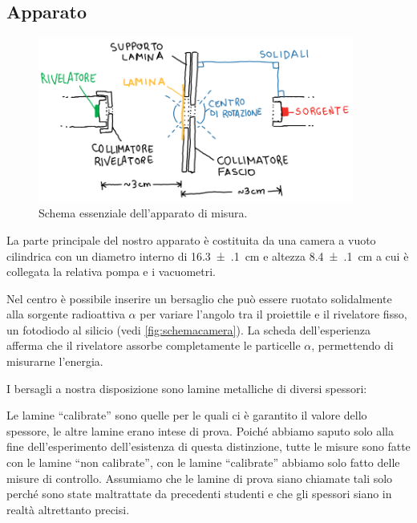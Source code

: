 \subsection{Apparato}

\begin{figure}
	\centering
	\includegraphics[width=28em]{immagini/schemacamera}
	\caption{\label{fig:schemacamera}
	Schema essenziale dell'apparato di misura.}
\end{figure}

La parte principale del nostro apparato è costituita da una camera a vuoto cilindrica con un diametro interno di  \SI{16.3(1)}{cm} e altezza \SI{8.4(1)}{cm} a cui è collegata la relativa pompa e i vacuometri.

Nel centro è possibile inserire un bersaglio che può essere ruotato solidalmente alla sorgente radioattiva $\alpha$
per variare l'angolo tra il proiettile e il rivelatore fisso, un fotodiodo al silicio (vedi \autoref{fig:schemacamera}).
La scheda dell'esperienza afferma che il rivelatore assorbe completamente le particelle $\alpha$,
permettendo di misurarne l'energia.

I bersagli a nostra disposizione sono lamine metalliche di diversi spessori:
Le lamine ``calibrate'' sono quelle per le quali ci è garantito il valore dello spessore,
le altre lamine erano intese di prova.
Poiché abbiamo saputo solo alla fine dell'esperimento dell'esistenza di questa distinzione,
tutte le misure sono fatte con le lamine ``non calibrate'',
con le lamine ``calibrate'' abbiamo solo fatto delle misure di controllo.
Assumiamo che le lamine di prova siano chiamate tali solo perché sono state maltrattate
da precedenti studenti e che gli spessori siano in realtà altrettanto precisi\footnotemark.


